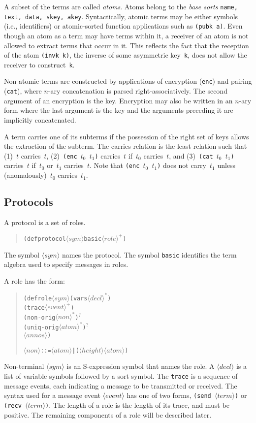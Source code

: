 \documentclass[titlepage,12pt]{article}
\theoremstyle{definition}
\newcommand{\nterm}[1]{\ensuremath{\langle\mathit{#1}\rangle}}
\newcommand{\nterms}[1]{\ensuremath{\nterm{#1}^\ast}}
\newcommand{\ntermp}[1]{\ensuremath{\nterm{#1}^+}}
\newcommand{\ntermo}[1]{#1$^?$}
\begin{document}
A subset of the terms are called {\em atoms}. Atoms belong to the {\em
  base sorts} \texttt{name, text, data, skey, akey}.  Syntactically,
atomic terms may be either symbols (i.e., identifiers) or
atomic-sorted function applications such as \texttt{(pubk~a)}.  Even
though an atom as a term may have terms within it, a receiver of an
atom is not allowed to extract terms that occur in it.  This reflects
the fact that the reception of the atom \texttt{(invk~k)}, the inverse
of some asymmetric key~\texttt{k}, does not allow the receiver to
construct~\texttt{k}.

Non-atomic terms are constructed by applications of encryption
(\texttt{enc}) and pairing (\texttt{cat}), where $n$-ary concatenation
is parsed right-associatively.  The second argument of an encryption
is the key. Encryption may also be written in an $n$-ary form where
the last argument is the key and the arguments preceding it are
implicitly concatenated.

A term carries one of its subterms if the possession of the right set
of keys allows the extraction of the subterm.  The carries relation is
the least relation such that (1)~$t$ carries~$t$, (2)~\texttt{(enc
  $t_0$ $t_1$)} carries~$t$ if~$t_0$ carries~$t$, and (3)~\texttt{(cat
  $t_0$ $t_1$)} carries~$t$ if~$t_0$ or~$t_1$ carries~$t$.  Note that
\texttt{(enc $t_0$ $t_1$)} does not carry~$t_1$ unless (anomalously)~$t_0$
carries~$t_1$.

\subsection{Protocols}

A protocol is a set of roles.
\begin{quote}
\begin{alltt}
(defprotocol \nterm{sym} basic \ntermp{role})
\end{alltt}
\end{quote}
The symbol \nterm{sym} names the protocol.  The symbol \texttt{basic}
identifies the term algebra used to specify messages in roles.

A role has the form:
\begin{quote}
\begin{alltt}
(defrole \nterm{sym} (vars \nterms{decl})
\quad (trace \ntermp{event})
\quad \ntermo{(non-orig \nterms{non})}
\quad \ntermo{(uniq-orig \nterms{atom})}
\quad \nterm{annos})

\nterm{non} ::= \nterm{atom} | (\nterm{height} \nterm{atom})
\end{alltt}
\end{quote}
Non-terminal \nterm{sym} is an S-expression symbol that names the
role.  A \nterm{decl} is a list of variable symbols followed by a sort
symbol.  The \texttt{trace} is a sequence of message events, each
indicating a message to be transmitted or received.  The syntax used
for a message event \nterm{event} has
one of two forms, \texttt{(send \nterm{term})} or \texttt{(recv
  \nterm{term})}.  The length of a role is the length of its trace,
and must be positive.  The remaining components of a role will be
described later.
\end{document}
